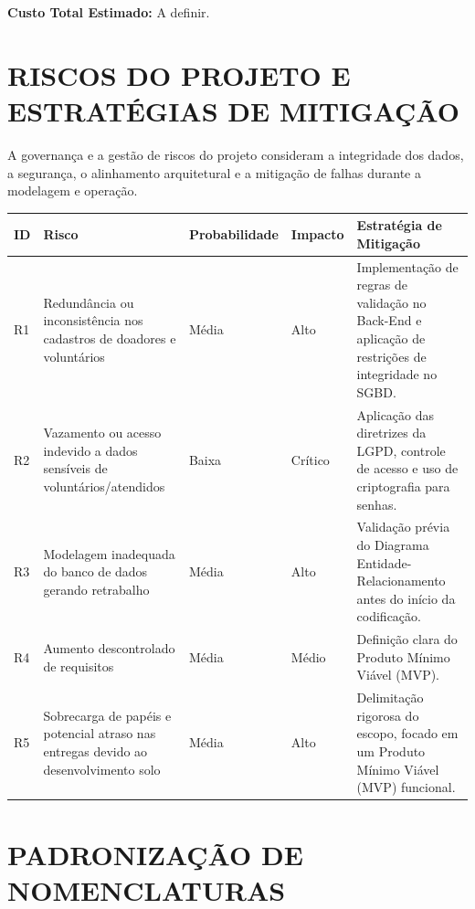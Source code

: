 \documentclass[12pt,a4paper]{article}
\begin{document}
\textbf{Custo Total Estimado:} A definir.


\section*{RISCOS DO PROJETO E ESTRATÉGIAS DE MITIGAÇÃO}

A governança e a gestão de riscos do projeto consideram a integridade
dos dados, a segurança, o alinhamento arquitetural e a mitigação de
falhas durante a modelagem e operação.

\begin{longtable}{P{0.8cm}P{3.1cm}P{2cm}P{1.8cm}P{6cm}}
\toprule
\textbf{ID} & \textbf{Risco} & \textbf{Probabilidade} &
\textbf{Impacto} & \textbf{Estratégia de Mitigação}\\
\midrule
R1 &
Redundância ou inconsistência nos cadastros de doadores e voluntários &
Média & Alto &
Implementação de regras de validação no Back-End e aplicação de
restrições de integridade no SGBD.\\

R2 &
Vazamento ou acesso indevido a dados sensíveis de
voluntários/atendidos &
Baixa & Crítico &
Aplicação das diretrizes da LGPD, controle de acesso e uso de
criptografia para senhas.\\

R3 &
Modelagem inadequada do banco de dados gerando retrabalho &
Média & Alto &
Validação prévia do Diagrama Entidade-Relacionamento antes do início
da codificação.\\

R4 &
Aumento descontrolado de requisitos &
Média & Médio &
Definição clara do Produto Mínimo Viável (MVP).\\

R5 &
Sobrecarga de papéis e potencial atraso nas entregas devido ao
desenvolvimento solo &
Média & Alto &
Delimitação rigorosa do escopo, focado em um Produto Mínimo Viável
(MVP) funcional.\\
\bottomrule
\end{longtable}


\section*{PADRONIZAÇÃO DE NOMENCLATURAS}
\end{document}
